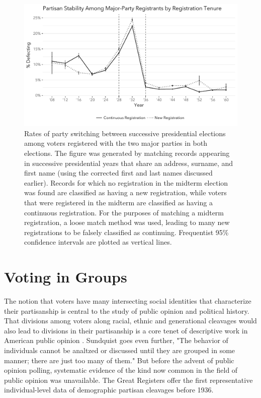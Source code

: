 \documentclass[11pt]{scrartcl}\usepackage[]{graphicx}\usepackage[]{color}
\makeatletter
\def\maxwidth{ %
  \ifdim\Gin@nat@width>\linewidth
    \linewidth
  \else
    \Gin@nat@width
  \fi
}
\newenvironment{knitrout}{}{} %
\makeatother
\begin{document}
\begin{knitrout}
\color{fgcolor}\begin{figure}

{\centering \includegraphics[width=\maxwidth]{figures/plots-prop14-1} 

}

\caption[Rates of party switching between successive presidential elections among voters registered with the two major parties in both elections]{Rates of party switching between successive presidential elections among voters registered with the two major parties in both elections. The figure was generated by matching records appearing in successive presidential years that share an address, surname, and first name (using the corrected first and last names discussed earlier). Records for which no registration in the midterm election was found are classified as having a new registration, while voters that were registered in the midterm are classified as having a continuous registration. For the purposes of matching a midterm registration, a loose match method was used, leading to many new registrations to be falsely classified as continuing. Frequentist 95\% confidence intervals are plotted as vertical lines.}\label{fig:prop14}
\end{figure}


\end{knitrout}


\section*{Voting in Groups}

The notion that voters have many intersecting social identities that characterize their partisanship is central to the study of public opinion and political history. That divisions among voters along racial, ethnic and generational cleavages would also lead to divisions in their partisanship is a core tenet of descriptive work in American public opinion \citep{berelson1954voting}. Sundquist \citeyearpar{sundquiest1983dynamic} goes even further, "The behavior of individuals cannot be analtzed or discussed  until they are grouped in some manner; there are just too many of them." But before the advent of public opinion polling, systematic evidence of the kind now common in the field of public opinion was  unavailable.  The Great Registers offer the first representative individual-level data of demographic partisan cleavages before 1936.
\end{document}
